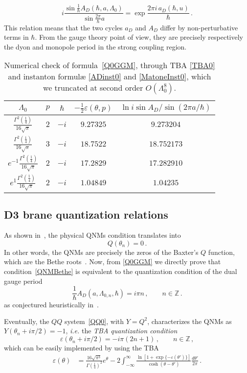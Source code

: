 \documentclass[11pt,a4paper]{elsarticle}
\def \h {\hbar}
\def \th {\theta}
\newcommand{\be}{\begin{equation}}
\newcommand{\ee}{\end{equation}}
\def\h{\hbar}
\def\th{\theta}
\numberwithin{figure}{section}
\numberwithin{table}{section}
\begin{document}
\be
 i \frac{\sin \frac{1}{\hbar}A_D(\hbar,a,\Lambda_0)}{\sin  \frac{2\pi }{\hbar} a}  = \exp \frac{2 \pi i \,a_D(\hbar ,u)}{\hbar} \label{ADaD} \,.
\ee
This relation means that the two cycles $a_D$ and $A_D$ differ by non-perturbative terms in $\h$. From the gauge theory point of view, they are precisely respectively the dyon and monopole period in the strong coupling region.
\begin{table}
\centering
\begin{tabular}{c|c|c|c|c}
$\Lambda_0$&$ p$&$\hbar $ &$-\frac{1}{2} \varepsilon(\th,p)$& $\ln i \sin A_D/\sin (2 \pi a/\hbar)$ \\
\hline 
$\frac{\Gamma^2(\frac{1}{4})}{16 \sqrt{\pi}}$&$2$&$-i$ &$9.27325$ & $9.273204$ \\
$ \frac{\Gamma^2(\frac{1}{4})}{16 \sqrt{\pi}}$&$3$&$-i $ &$18.7522$ & $18.752173$ \\
$ e^{-1}\frac{\Gamma^2(\frac{1}{4})}{16 \sqrt{\pi}}$&$2$&$-i$ &$17.2829$ & $17.282910$ \\
$ e^{1}\frac{\Gamma^2(\frac{1}{4})}{16 \sqrt{\pi}}$&$2$&$-i$ &$1.04849$ & $1.04235$ \\
\end{tabular}
\caption{Numerical check of formula~\eqref{Q0GGM}, through TBA \eqref{TBA0} and instanton formul{\ae} \eqref{ADinst0} and \eqref{MatoneInst0}, which we truncated at second order $O(\Lambda_0^8)$.}
\label{tabQAD0}
\end{table}

\subsection{D3 brane quantization relations} \label{D3brane}


As shown in~\cite{FioravantiGregori:2021}, the physical QNMs condition translates into
\be  \label{QNMBethe}
Q(\th_n) =0 \,.
\ee 
In other words, the QNMs are precisely the zeros of the Baxter's $Q$ function, which are the Bethe roots~\cite{BazhanovLukyanovZamolodchikov:1997}. Now, from \eqref{Q0GGM} we directly prove that condition~\eqref{QNMBethe} is equivalent to the quantization condition of the dual gauge period
\be  \label{QuantAD0}
\frac{1}{\hbar}A_D(a,\Lambda_{0,n},\hbar) = i\pi  n \,,\qquad n \in \mathbb{Z}\,.
\ee 
as conjectured heuristically in~\cite{AminovGrassiHatsuda:2020}. 

Eventually, the $QQ$ system~\eqref{QQ0}, with $Y=Q^2$, characterizes the QNMs as $Y(\th_n+i\pi/2)=-1$, {\it i.e.} the {\it TBA quantization condition} 
\be \label{quanteps0}
\varepsilon(\th_{n} +i \pi/2) = - i \pi(2n+1) \,, \qquad n \in \mathbb{Z}\,,
\ee 
which can be easily implemented by using the TBA
\begin{align} 
\varepsilon(\theta)   &=  \frac{16\sqrt{\pi^3}}{\Gamma(\frac{1}{4})^2} e^{\theta} - 2 \int_{-\infty}^\infty\frac{ \ln \left [ 1 +  \exp \{ - \varepsilon(\theta') \} \right ] }{\cosh (\theta-\theta' ) } \frac{d \theta'}{ 2 \pi} \, .
\label{TBA0} 
\end{align} 
\end{document}
